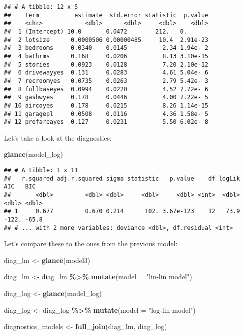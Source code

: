 \documentclass[
]{article}
\newenvironment{Shaded}{\begin{snugshade}}{\end{snugshade}}
\newcommand{\DataTypeTok}[1]{\textcolor[rgb]{0.13,0.29,0.53}{#1}}
\newcommand{\KeywordTok}[1]{\textcolor[rgb]{0.13,0.29,0.53}{\textbf{#1}}}
\newcommand{\NormalTok}[1]{#1}
\newcommand{\OperatorTok}[1]{\textcolor[rgb]{0.81,0.36,0.00}{\textbf{#1}}}
\newcommand{\StringTok}[1]{\textcolor[rgb]{0.31,0.60,0.02}{#1}}
\begin{document}
\begin{verbatim}
## # A tibble: 12 x 5
##    term          estimate  std.error statistic  p.value
##    <chr>            <dbl>      <dbl>     <dbl>    <dbl>
##  1 (Intercept) 10.0       0.0472        212.   0.      
##  2 lotsize      0.0000506 0.00000485     10.4  2.91e-23
##  3 bedrooms     0.0340    0.0145          2.34 1.94e- 2
##  4 bathrms      0.168     0.0206          8.13 3.10e-15
##  5 stories      0.0923    0.0128          7.20 2.10e-12
##  6 drivewayyes  0.131     0.0283          4.61 5.04e- 6
##  7 recroomyes   0.0735    0.0263          2.79 5.42e- 3
##  8 fullbaseyes  0.0994    0.0220          4.52 7.72e- 6
##  9 gashwyes     0.178     0.0446          4.00 7.22e- 5
## 10 aircoyes     0.178     0.0215          8.26 1.14e-15
## 11 garagepl     0.0508    0.0116          4.36 1.58e- 5
## 12 prefareayes  0.127     0.0231          5.50 6.02e- 8
\end{verbatim}

Let's take a look at the diagnostics:

\begin{Shaded}
\begin{Highlighting}[]
\KeywordTok{glance}\NormalTok{(model\_log)}
\end{Highlighting}
\end{Shaded}

\begin{verbatim}
## # A tibble: 1 x 11
##   r.squared adj.r.squared sigma statistic   p.value    df logLik   AIC   BIC
##       <dbl>         <dbl> <dbl>     <dbl>     <dbl> <int>  <dbl> <dbl> <dbl>
## 1     0.677         0.670 0.214      102. 3.67e-123    12   73.9 -122. -65.8
## # ... with 2 more variables: deviance <dbl>, df.residual <int>
\end{verbatim}

Let's compare these to the ones from the previous model:

\begin{Shaded}
\begin{Highlighting}[]
\NormalTok{diag\_lm \textless{}{-}}\StringTok{ }\KeywordTok{glance}\NormalTok{(model3)}

\NormalTok{diag\_lm \textless{}{-}}\StringTok{ }\NormalTok{diag\_lm }\OperatorTok{\%\textgreater{}\%}
\StringTok{  }\KeywordTok{mutate}\NormalTok{(}\DataTypeTok{model =} \StringTok{"lin{-}lin model"}\NormalTok{)}

\NormalTok{diag\_log \textless{}{-}}\StringTok{ }\KeywordTok{glance}\NormalTok{(model\_log)}

\NormalTok{diag\_log  \textless{}{-}}\StringTok{ }\NormalTok{diag\_log }\OperatorTok{\%\textgreater{}\%}
\StringTok{  }\KeywordTok{mutate}\NormalTok{(}\DataTypeTok{model =} \StringTok{"log{-}lin model"}\NormalTok{)}

\NormalTok{diagnostics\_models \textless{}{-}}\StringTok{ }\KeywordTok{full\_join}\NormalTok{(diag\_lm, diag\_log)}
\end{Highlighting}
\end{Shaded}
\end{document}
